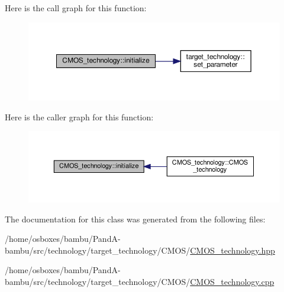 Here is the call graph for this function\+:
\nopagebreak
\begin{figure}[H]
\begin{center}
\leavevmode
\includegraphics[width=350pt]{de/da2/classCMOS__technology_af6aed0f6dc8bf72c8914a14c00b949a7_cgraph}
\end{center}
\end{figure}
Here is the caller graph for this function\+:
\nopagebreak
\begin{figure}[H]
\begin{center}
\leavevmode
\includegraphics[width=350pt]{de/da2/classCMOS__technology_af6aed0f6dc8bf72c8914a14c00b949a7_icgraph}
\end{center}
\end{figure}


The documentation for this class was generated from the following files\+:\begin{DoxyCompactItemize}
\item 
/home/osboxes/bambu/\+Pand\+A-\/bambu/src/technology/target\+\_\+technology/\+C\+M\+O\+S/\hyperlink{CMOS__technology_8hpp}{C\+M\+O\+S\+\_\+technology.\+hpp}\item 
/home/osboxes/bambu/\+Pand\+A-\/bambu/src/technology/target\+\_\+technology/\+C\+M\+O\+S/\hyperlink{CMOS__technology_8cpp}{C\+M\+O\+S\+\_\+technology.\+cpp}\end{DoxyCompactItemize}

